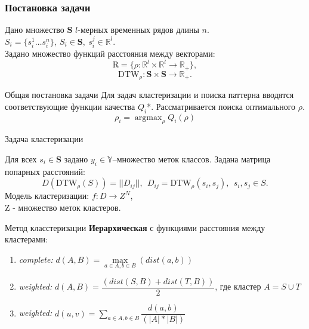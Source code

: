 \documentclass{beamer}
\DeclareMathOperator*{\argmax}{argmax}
\begin{document}

\begin{frame}
\frametitle{Постановка задачи}
    \begin{block}{}
        Дано множество $\boldsymbol{S}$ $l$\--мерных  временных рядов длины $n$. $S_i = \{s_i^1 \dots s_i^n\},\ S_i \in \boldsymbol{S},\ s_i^j \in \mathbb{R}^l$.\\
        Задано множество функций расстояния между векторами:
        $$\mathrm{R} = \{\rho: \mathbb{R}^l \times \mathbb{R}^l \rightarrow \mathbb{R}_+ \},$$
        $$\text{DTW}_{\rho}: \boldsymbol{S} \times \boldsymbol{S} \rightarrow \mathbb{R}_+.$$
    \end{block}

    \begin{block}{Общая постановка задачи}
        Для задач кластеризации и поиска паттерна вводятся соответствующие функции качества $Q_i$*.
        Рассматривается поиска оптимального $\rho$.
        $$
            \rho_i = \argmax_{\rho} Q_i(\rho)
        $$
    \end{block}
\end{frame}

\begin{frame}

    \begin{block}{Задача кластеризации}

        Для всех $s_i \in \boldsymbol{S}$ задано ${y_i \in \mathbb{Y}}$\---множество меток классов.
        Задана матрица попарных расстояний:
        $$D(\text{DTW}_\rho(S)) = ||D_{ij}||, \ \ D_{ij} = \text{DTW}_\rho(s_i, s_j),\ \ s_i, s_j \in S.$$
        Модель кластеризации: $f: D \rightarrow Z^N$,\\ Z \-- множество меток кластеров.

    \end{block}

    \begin{block}{Метод класстеризации}
        \textbf{Иерархическая} с функциями расстояния между кластерами: 
        \begin{enumerate}
            \item \textit{complete:}  $d(A, B) = \max\limits_{a \in A, b \in B}(dist(a, b))$ 
            \item \textit{weighted:}  $d(A,B) = \dfrac{(dist(S,B) + dist(T,B))}{2}$, где кластер $A = S \cup T$
            \item \textit{weighted:}  $d(u,v) = \sum\limits_{a \in A, b \in B} \dfrac{d(a, b)}{(|A|*|B|)}$ 
        \end{enumerate} 
    \end{block}
\end{frame}
\end{document}
